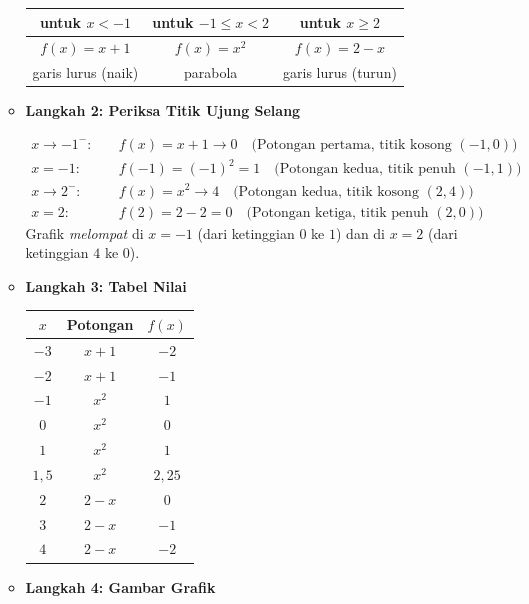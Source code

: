 \documentclass[10pt,a4paper]{article}
\newcounter{eqblock}
\newcommand{\reseteq}{%
  \stepcounter{eqblock}%
  \setcounter{equation}{0}%
  \renewcommand{\theHequation}{\arabic{eqblock}.\arabic{equation}}%
}
\begin{document}
\begin{enumerate}
\begin{itemize}
\begin{center}
\begin{tabular}{c|c|c}
untuk $x < -1$ & untuk $-1 \le x < 2$ & untuk $x \ge 2$ \\ \hline
$f(x) = x + 1$ & $f(x) = x^2$ & $f(x) = 2 - x$ \\
garis lurus (naik) & parabola & garis lurus (turun)
\end{tabular}
\end{center}

\item \textbf{Langkah 2: Periksa Titik Ujung Selang}

\reseteq
\begin{align}
x \to -1^{-}: \quad &f(x) = x + 1 \to 0 \quad \text{(Potongan pertama, titik kosong $(-1,0)$)} \\
x = -1: \quad &f(-1) = (-1)^2 = 1 \quad \text{(Potongan kedua, titik penuh $(-1,1)$)} \\
x \to 2^{-}: \quad &f(x) = x^2 \to 4 \quad \text{(Potongan kedua, titik kosong $(2,4)$)} \\
x = 2: \quad &f(2) = 2 - 2 = 0 \quad \text{(Potongan ketiga, titik penuh $(2,0)$)}
\end{align}
Grafik \emph{melompat} di $x = -1$ (dari ketinggian $0$ ke $1$) dan di $x = 2$ (dari ketinggian $4$ ke $0$).

\item \textbf{Langkah 3: Tabel Nilai}

\begin{center}
\begin{tabular}{c|c|c}
$x$ & Potongan & $f(x)$ \\ \hline
$-3$ & $x + 1$ & $-2$ \\
$-2$ & $x + 1$ & $-1$ \\
$-1$ & $x^2$ & $1$ \\
$0$ & $x^2$ & $0$ \\
$1$ & $x^2$ & $1$ \\
$1{,}5$ & $x^2$ & $2{,}25$ \\
$2$ & $2 - x$ & $0$ \\
$3$ & $2 - x$ & $-1$ \\
$4$ & $2 - x$ & $-2$
\end{tabular}
\end{center}

\item \textbf{Langkah 4: Gambar Grafik}


\end{itemize}
\end{enumerate}
\end{document}
